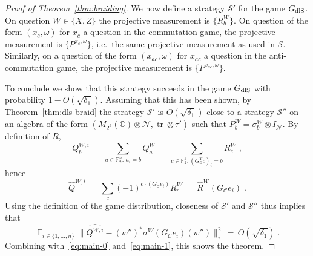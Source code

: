 \documentclass[11pt]{article}
\theoremstyle{definition}
\newcommand{\strategy}{\mathscr{S}}
\DeclareMathOperator*{\Expectation}{\mathbb{E}}
\newcommand{\Es}[1]{\Expectation_{#1}}
\newcommand{\C}{\ensuremath{\mathbb{C}}}
\newcommand{\dlS}{\ensuremath{\rm dlS}}
\newcommand{\F}{\ensuremath{\mathbb{F}}}
\newcommand{\mC}{\ensuremath{\mathcal{C}}}
\newcommand{\mN}{\mathcal{N}}
\DeclareMathOperator{\tr}{tr}
\begin{document}
\begin{proof}[Proof of Theorem~\ref{thm:braiding}]
We now define a strategy $\strategy'$ for the game $G_{\dlS}$. On question $W\in \{X,Z\}$ the projective measurement is $\{R^W_b\}$. On question of the form $(x_c,\omega)$ for $x_c$ a question in the commutation game, the projective measurement is $\{P^{x_c,\omega}\}$, i.e.\ the same projective measurement as used in $\strategy$. Similarly, on a question of the form $(x_{ac},\omega)$ for $x_{ac}$ a question in the anti-commutation game, the projective measurement is $\{P^{x_{ac},\omega}\}$.

To conclude we show that this strategy succeeds in the game $G_{\dlS}$ with probability $1-O(\sqrt{\delta_1})$. Assuming that this has been shown, by Theorem~\ref{thm:dls-braid} the strategy $\strategy'$ is $O(\sqrt{\delta_1})$-close to a strategy $\strategy''$ on an algebra of the form $(M_{2^{k}}(\C)\otimes \mN,\tr\otimes \tau')$ such that $P^W_b = \sigma^W_b\otimes I_\mN$. By definition of $R$, 
\begin{equation}\label{eq:main-3}
 Q^{W,i}_b \,=\,  \sum_{a \in \F_2^n:\,a_i=b}  Q^W_a \,=\, \sum_{c \in \F^k_2: (G_\mC^T c)_i=b}  R^W_c \;,
\end{equation}
hence
\begin{equation*}
 \widehat{Q}^{W,i}\,=\, \sum_c (-1)^{c\cdot (G_\mC e_i)} R^W_c \,=\, \widehat{R}^W(G_\mC e_i)\;.
\end{equation*}
Using the definition of the game distribution, closeness of $\strategy'$ and $\strategy''$ thus implies that
\begin{equation*}
\Es{i\in\{1,\ldots,n\}} \big\|\widehat{Q^{W,i}} - (w'')^* {\sigma^W}(G_\mC e_i) (w'') \big\|_\tau^2 \,=\,O(\sqrt{\delta_1})\;.
\end{equation*}
Combining with~\eqref{eq:main-0} and~\eqref{eq:main-1}, this shows the theorem.


\end{proof}
\end{document}
